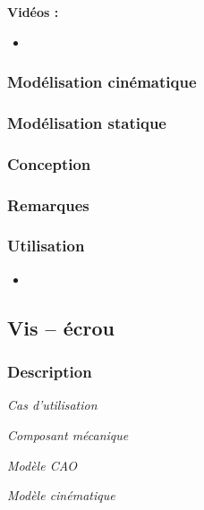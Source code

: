 \documentclass[11pt,oneside]{article}
\begin{document}
\textbf{Vidéos :}
\begin{itemize}
\item
\end{itemize}

\subsubsection{Modélisation cinématique}
\subsubsection{Modélisation statique}
\subsubsection{Conception}
\subsubsection{Remarques}
\subsubsection{Utilisation}
\begin{itemize}
\item
\end{itemize}

\newpage

\subsection{Vis -- écrou}
\subsubsection{Description}

\begin{center}
\hfill
\begin{minipage}[c]{.21\linewidth}
\begin{center}
\textit{Cas d'utilisation}
\end{center}
\end{minipage} \hfill
\begin{minipage}[c]{.21\linewidth}
\begin{center}
\textit{Composant mécanique}
\end{center}
\end{minipage} \hfill
\begin{minipage}[c]{.21\linewidth}
\begin{center}
\textit{Modèle CAO}
\end{center} 
\end{minipage}\hfill
\begin{minipage}[c]{.21\linewidth}
\begin{center}
\textit{Modèle cinématique}
\end{center} 
\end{minipage}\hfill
\end{center}
\end{document}
